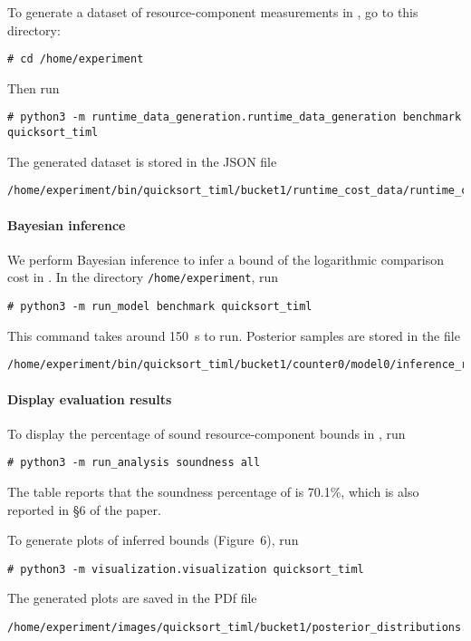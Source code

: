 To generate a dataset of resource-component measurements in \quicksorttiml{},
go to this directory:
\begin{verbatim}
# cd /home/experiment
\end{verbatim}
%
Then run
\begin{verbatim}
# python3 -m runtime_data_generation.runtime_data_generation benchmark quicksort_timl
\end{verbatim}
%
The generated dataset is stored in the JSON file
\begin{verbatim}
/home/experiment/bin/quicksort_timl/bucket1/runtime_cost_data/runtime_cost_data.json
\end{verbatim}

\paragraph{Bayesian inference}

We perform Bayesian inference to infer a bound of the logarithmic comparison cost in \quicksorttiml{}.
%
In the directory \texttt{/home/experiment}, run
\begin{verbatim}
# python3 -m run_model benchmark quicksort_timl
\end{verbatim}
%
This command takes around \qty{150}{\second} to run.
%
Posterior samples are stored in the file
\begin{verbatim}
/home/experiment/bin/quicksort_timl/bucket1/counter0/model0/inference_result.json
\end{verbatim}

\paragraph{Display evaluation results}

To display the percentage of sound resource-component bounds in
\quicksorttiml{}, run
\begin{verbatim}
# python3 -m run_analysis soundness all
\end{verbatim}
%
The table reports that the soundness percentage of \quicksorttiml{} is 70.1\%,
which is also reported in \S6 of the paper.

To generate plots of inferred bounds (Figure~6), run
\begin{verbatim}
# python3 -m visualization.visualization quicksort_timl
\end{verbatim}
%
The generated plots are saved in the PDf file
\begin{verbatim}
/home/experiment/images/quicksort_timl/bucket1/posterior_distributions.pdf
\end{verbatim}
